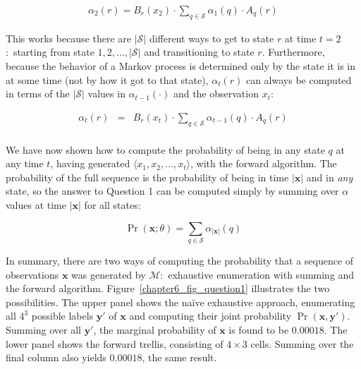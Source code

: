 \begin{eqnarray*}
\alpha_2(r) =  B_r(x_2) \cdot \sum_{q \in \mathcal{S}} \alpha_1(q) \cdot A_q(r)
\end{eqnarray*}

\noindent This works because there are $|\mathcal{S}|$ different ways
to get to state $r$ at time $t=2$:\ starting from state
$1,2,\ldots,|\mathcal{S}|$ and transitioning to state $r$.
Furthermore, because the behavior of a Markov process is determined
only by the state it is in at some time (not by how it got to that
state), $\alpha_t(r)$ can always be computed in terms of the
$|\mathcal{S}|$ values in $\alpha_{t-1}(\cdot)$ and the observation
$x_t$:

\begin{eqnarray*}
\alpha_t(r) & = & B_r(x_t) \cdot \sum_{q \in \mathcal{S}} \alpha_{t-1}(q) \cdot A_q(r)  \\
\end{eqnarray*}

\noindent We have now shown how to compute the probability of being in
any state $q$ at any time $t$, having generated $\langle x_1, x_2,
\ldots , x_t \rangle$, with the forward algorithm.  The probability of
the full sequence is the probability of being in time $|\textbf{x}|$
and in \emph{any} state, so the answer to Question 1 can be computed
simply by summing over $\alpha$ values at time $|\textbf{x}|$ for all
states:

\begin{equation}
\Pr(\textbf{x};\theta) = \sum_{q \in \mathcal{S}} \alpha_{|\textbf{x}|}(q)
\end{equation}

\noindent In summary, there are two ways of computing the probability
that a sequence of observations $\textbf{x}$ was generated by
$\mathcal{M}$:\ exhaustive enumeration with summing and the forward
algorithm.  Figure~\ref{chapter6_fig_question1} illustrates the two
possibilities.  The upper panel shows the na\"{i}ve exhaustive
approach, enumerating all $4^3$ possible labels $\textbf{y}'$ of
$\textbf{x}$ and computing their joint probability
$\Pr(\textbf{x},\textbf{y}')$.  Summing over all $\textbf{y}'$, the
marginal probability of $\textbf{x}$ is found to be $0.00018$. The
lower panel shows the forward trellis, consisting of $4 \times 3$
cells.  Summing over the final column also yields $0.00018$, the same
result.

